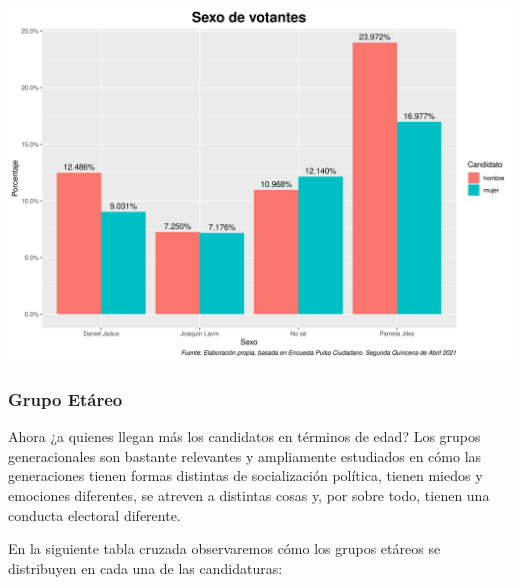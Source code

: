 \documentclass[
]{article}
\begin{document}
\includegraphics{SexoPlot.png}

\hypertarget{grupo-etuxe1reo}{%
\subsubsection{\texorpdfstring{\textbf{Grupo
Etáreo}}{Grupo Etáreo}}\label{grupo-etuxe1reo}}

Ahora ¿a quienes llegan más los candidatos en términos de edad? Los
grupos generacionales son bastante relevantes y ampliamente estudiados
en cómo las generaciones tienen formas distintas de socialización
política, tienen miedos y emociones diferentes, se atreven a distintas
cosas y, por sobre todo, tienen una conducta electoral diferente.

En la siguiente tabla cruzada observaremos cómo los grupos etáreos se
distribuyen en cada una de las candidaturas:

\newline
\end{document}
